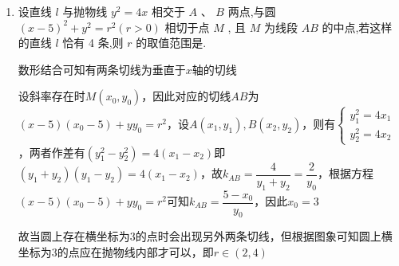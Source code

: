 \begin{enumerate}
\begin{jieda}
\begin{enumerate}
\begin{dingautolist}{172}
                联立 $\left\{  \begin{array}{l} \dfrac{{x}^{2}}{4} - {y}^{2} = 1, \\  y = {kx} + m, \end{array}\right.$ 整理得 $\left( {4{k}^{2} - 1}\right) {x}^{2} + {8kmx} + 4{m}^{2} + 4 = 0$ ,
                
                $\Delta  = {64}{k}^{2}{m}^{2} - {16}\left( {4{k}^{2} - 1}\right) \left( {{m}^{2} + 1}\right)  = 0$，整理得 $4{k}^{2} = {m}^{2} + 1$ ,
                
                联立 $\left\{  \begin{array}{l} \dfrac{{x}^{2}}{4} - {y}^{2} = 0, \\  y = {kx} + m, \end{array}\right.$ 整理得 $\left( {4{k}^{2} - 1}\right) {x}^{2} + {8kmx} + 4{m}^{2} = 0$ ,
                
                则 ${x}_{1} + {x}_{2} =  - \dfrac{8km}{4{k}^{2} - 1} =  - \dfrac{8km}{{m}^{2}} =  - \dfrac{8k}{m}$ ,则 ${x}_{M} = \dfrac{{x}_{1} + {x}_{2}}{2} =  - \dfrac{4k}{m}$
                
                则 ${x}_{M}^{2} = \dfrac{{16}{k}^{2}}{{m}^{2}} = 4 + \dfrac{4}{{m}^{2}} > 4$，即 $|{x}_{M}| > 2$（事实上$x_M$为正），此时点 $M$ 到 $y$ 轴的距离大于 2 .
            \end{dingautolist}
            综上所述，点 $M$ 到 $y$ 轴的最小距离为 2 .
        \end{enumerate}
    \end{jieda}
    \item 设直线 $l$ 与抛物线 ${y}^{2} = {4x}$ 相交于 $A\text{ 、 }B$ 两点,与圆 ${\left( x - 5\right) }^{2} + {y}^{2} = {r}^{2}\left( {r > 0}\right)$ 相切于点 $M$ , 且 $M$ 为线段 ${AB}$ 的中点,若这样的直线 $l$ 恰有 4 条,则 $r$ 的取值范围是.
    \begin{jieda}
        数形结合可知有两条切线为垂直于$x$轴的切线

        设斜率存在时$M(x_0, y_0)$，因此对应的切线$AB$为$(x-5)(x_0 - 5)+yy_0 = r^2$，设$A(x_1, y_1), B(x_2, y_2)$，则有$\left\{\begin{array}{l}
             y_1^2 = 4x_1 \\
             y_2^2 = 4x_2
        \end{array}\right.$，两者作差有$(y_1^2 - y_2^2) = 4(x_1-x_2)$即$(y_1+y_2)(y_1 - y_2) = 4(x_1-x_2)$，故$k_{AB} = \dfrac{4}{y_1+y_2} = \dfrac{2}{y_0}$，根据方程$(x-5)(x_0 - 5)+yy_0 = r^2$可知$k_{AB} = \dfrac{5-x_0}{y_0}$，因此$x_0 = 3$

        故当圆上存在横坐标为$3$的点时会出现另外两条切线，但根据图象可知圆上横坐标为$3$的点应在抛物线内部才可以，即$r \in (2, 4)$
    \end{jieda}
\end{enumerate}

